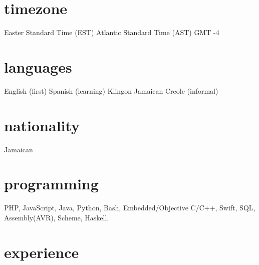 \documentclass[]{friggeri-cv} %
\begin{document}
\begin{aside}
\section{timezone}
Easter Standard Time (EST)
Atlantic Standard Time (AST)
GMT -4
\section{languages}
English (first)
Spanish (learning)
Klingon
Jamaican Creole (informal)
\section{nationality}
Jamaican
\section{programming}
 PHP, JavaScript, Java, Python, Bash, Embedded/Objective C/C++, Swift, SQL, Assembly(AVR), Scheme, Haskell.
\end{aside}


\section{experience}
\end{document}
